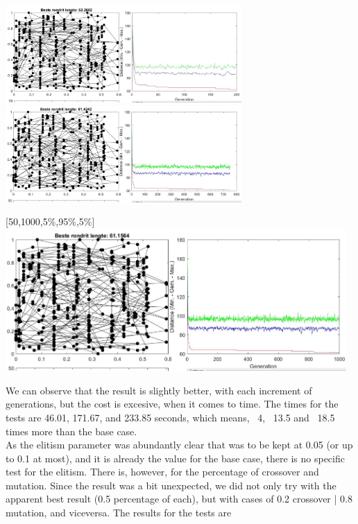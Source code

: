 \text{\big[50,200,5\%,95\%,5\%\big]}
\hfill
\text{\big[50,750,50,5\%,95\%,5\%\big]} \\
\includegraphics[width=9cm]{img/specific/xalt_edges/general_3.jpg}
\hfill
\includegraphics[width=9cm]{img/specific/xalt_edges/general_4.jpg}

\begin{center}
[50,1000,5\%,95\%,5\%]\\
\includegraphics[width=13cm]{img/specific/xalt_edges/general_5.jpg}
\end{center}

We can observe that the result is slightly better, with each increment of
generations, but the cost is excesive, when it comes to time. The times for the
tests are 46.01, 171.67, and 233.85 seconds, which means, ~4, ~13.5 and ~18.5
times more than the base case.
\\
As the elitism parameter was abundantly clear that was to be kept at 0.05 (or
up to 0.1 at most), and it is already the value for the base case, there is
no specific test for the elitism. There is, however, for the percentage of
crossover and mutation. Since the result was a bit unexpected, we did not only
try with the apparent best result (0.5 percentage of each), but with cases of
0.2 crossover | 0.8 mutation, and viceversa. The results for the tests are\\
\newpage

